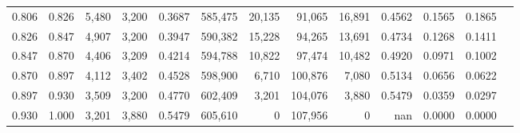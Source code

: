 \begin{tabular}{rrrrrrrrrrrrr}
0.806 & 0.826 &  5,480 & 3,200 &                                     0.3687 & 585,475 &  20,135 &  91,065 &  16,891 & 0.4562 & 0.1565 & 0.1865 \\
0.826 & 0.847 &  4,907 & 3,200 &                                     0.3947 & 590,382 &  15,228 &  94,265 &  13,691 & 0.4734 & 0.1268 & 0.1411 \\
0.847 & 0.870 &  4,406 & 3,209 &                                     0.4214 & 594,788 &  10,822 &  97,474 &  10,482 & 0.4920 & 0.0971 & 0.1002 \\
0.870 & 0.897 &  4,112 & 3,402 &                                     0.4528 & 598,900 &   6,710 & 100,876 &   7,080 & 0.5134 & 0.0656 & 0.0622 \\
0.897 & 0.930 &  3,509 & 3,200 &                                     0.4770 & 602,409 &   3,201 & 104,076 &   3,880 & 0.5479 & 0.0359 & 0.0297 \\
0.930 & 1.000 &  3,201 & 3,880 &                                     0.5479 & 605,610 &       0 & 107,956 &       0 &    nan & 0.0000 & 0.0000 \\
\bottomrule
\end{tabular}
